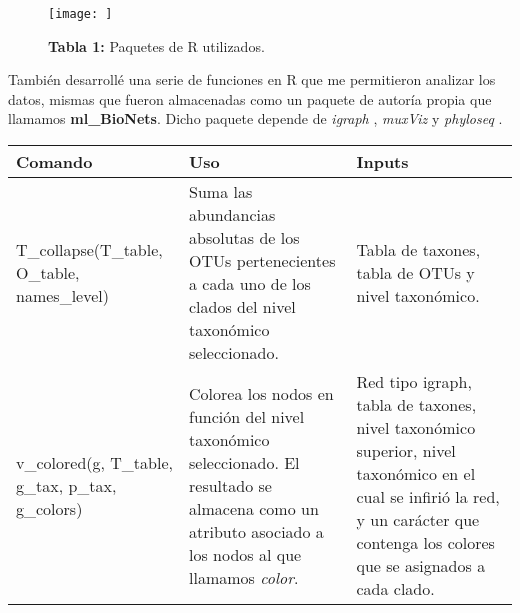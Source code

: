 \documentclass[
]{book}
\begin{document}
\begin{figure}
\centering
\texttt{[image: ]}
\caption{\textbf{Tabla 1:} Paquetes de R utilizados.}
\end{figure}

También desarrollé una serie de funciones en R que me permitieron analizar los datos, mismas que fueron almacenadas como un paquete de autoría propia que llamamos \textbf{ml\_BioNets}. Dicho paquete depende de \emph{igraph} \citep{igraph}, \emph{muxViz} \citep{muxViz} y \emph{phyloseq} \citep{phyloseq}.

\begin{longtable}[]{@{}lll@{}}
\toprule
\begin{minipage}[b]{0.35\columnwidth}\raggedright
Comando\strut
\end{minipage} & \begin{minipage}[b]{0.22\columnwidth}\raggedright
Uso\strut
\end{minipage} & \begin{minipage}[b]{0.35\columnwidth}\raggedright
Inputs\strut
\end{minipage}\tabularnewline
\midrule
\endhead
\begin{minipage}[t]{0.35\columnwidth}\raggedright
T\_collapse(T\_table, O\_table, names\_level)\strut
\end{minipage} & \begin{minipage}[t]{0.22\columnwidth}\raggedright
Suma las abundancias absolutas de los OTUs pertenecientes a cada uno de los clados del nivel taxonómico seleccionado.\strut
\end{minipage} & \begin{minipage}[t]{0.35\columnwidth}\raggedright
Tabla de taxones, tabla de OTUs y nivel taxonómico.\strut
\end{minipage}\tabularnewline
\begin{minipage}[t]{0.35\columnwidth}\raggedright
v\_colored(g, T\_table, g\_tax, p\_tax, g\_colors)\strut
\end{minipage} & \begin{minipage}[t]{0.22\columnwidth}\raggedright
Colorea los nodos en función del nivel taxonómico seleccionado. El resultado se almacena como un atributo asociado a los nodos al que llamamos \emph{color}.\strut
\end{minipage} & \begin{minipage}[t]{0.35\columnwidth}\raggedright
Red tipo igraph, tabla de taxones, nivel taxonómico superior, nivel taxonómico en el cual se infirió la red, y un carácter que contenga los colores que se asignados a cada clado.\strut

\end{minipage}
\end{longtable}
\end{document}
